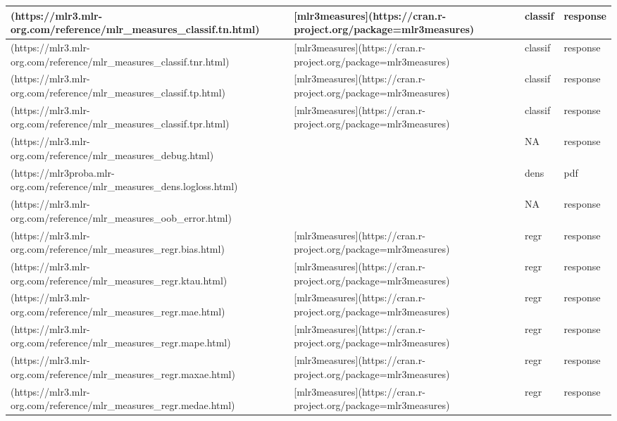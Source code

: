 \documentclass[
]{scrbook}
\begin{document}
\begin{tabular}{l|l|l|l}
\hline
[`classif.tn`](https://mlr3.mlr-org.com/reference/mlr\_measures\_classif.tn.html) & [mlr3measures](https://cran.r-project.org/package=mlr3measures) & classif & response\\
\hline
[`classif.tnr`](https://mlr3.mlr-org.com/reference/mlr\_measures\_classif.tnr.html) & [mlr3measures](https://cran.r-project.org/package=mlr3measures) & classif & response\\
\hline
[`classif.tp`](https://mlr3.mlr-org.com/reference/mlr\_measures\_classif.tp.html) & [mlr3measures](https://cran.r-project.org/package=mlr3measures) & classif & response\\
\hline
[`classif.tpr`](https://mlr3.mlr-org.com/reference/mlr\_measures\_classif.tpr.html) & [mlr3measures](https://cran.r-project.org/package=mlr3measures) & classif & response\\
\hline
[`debug`](https://mlr3.mlr-org.com/reference/mlr\_measures\_debug.html) &  & NA & response\\
\hline
[`dens.logloss`](https://mlr3proba.mlr-org.com/reference/mlr\_measures\_dens.logloss.html) &  & dens & pdf\\
\hline
[`oob\_error`](https://mlr3.mlr-org.com/reference/mlr\_measures\_oob\_error.html) &  & NA & response\\
\hline
[`regr.bias`](https://mlr3.mlr-org.com/reference/mlr\_measures\_regr.bias.html) & [mlr3measures](https://cran.r-project.org/package=mlr3measures) & regr & response\\
\hline
[`regr.ktau`](https://mlr3.mlr-org.com/reference/mlr\_measures\_regr.ktau.html) & [mlr3measures](https://cran.r-project.org/package=mlr3measures) & regr & response\\
\hline
[`regr.mae`](https://mlr3.mlr-org.com/reference/mlr\_measures\_regr.mae.html) & [mlr3measures](https://cran.r-project.org/package=mlr3measures) & regr & response\\
\hline
[`regr.mape`](https://mlr3.mlr-org.com/reference/mlr\_measures\_regr.mape.html) & [mlr3measures](https://cran.r-project.org/package=mlr3measures) & regr & response\\
\hline
[`regr.maxae`](https://mlr3.mlr-org.com/reference/mlr\_measures\_regr.maxae.html) & [mlr3measures](https://cran.r-project.org/package=mlr3measures) & regr & response\\
\hline
[`regr.medae`](https://mlr3.mlr-org.com/reference/mlr\_measures\_regr.medae.html) & [mlr3measures](https://cran.r-project.org/package=mlr3measures) & regr & response\\

\end{tabular}
\end{document}
